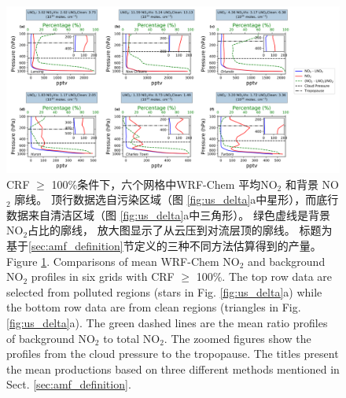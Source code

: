\begin{landscape}
\clearpage\vspace*{\fill}
\begin{figure}[!ht]
\centering
\includegraphics[width=0.85\columnwidth]{./figures/us_bkgd_comp.png}%
\caption{CRF $\geq$ 100\%条件下，六个网格中WRF-Chem 平均NO$_\textrm{2}$ 和背景 NO$_\textrm{2}$ 廓线。
顶行数据选自污染区域（图 \ref{fig:us_delta}a中星形），而底行数据来自清洁区域（图 \ref{fig:us_delta}a中三角形）。
绿色虚线是背景 NO$_\textrm{2}$占比的廓线，
放大图显示了从云压到对流层顶的廓线。
标题为基于\ref{sec:amf_definition}节定义的三种不同方法估算得到的产量。\\
Figure \ref{fig:us_bkgd_comp}. Comparisons of mean WRF-Chem NO$_\textrm{2}$ and background NO$_\textrm{2}$ profiles in six grids with CRF $\geq$ 100\%.
The top row data are selected from polluted regions (stars in Fig. \ref{fig:us_delta}a) while the bottom row data are from clean regions (triangles in Fig. \ref{fig:us_delta}a).
The green dashed lines are the mean ratio profiles of background NO$_\textrm{2}$ to total NO$_\textrm{2}$.
The zoomed figures show the profiles from the cloud pressure to the tropopause.
The titles present the mean productions based on three different methods mentioned in Sect. \ref{sec:amf_definition}.}
\label{fig:us_bkgd_comp}
\end{figure}
\vspace*{\fill}\clearpage
\end{landscape}

